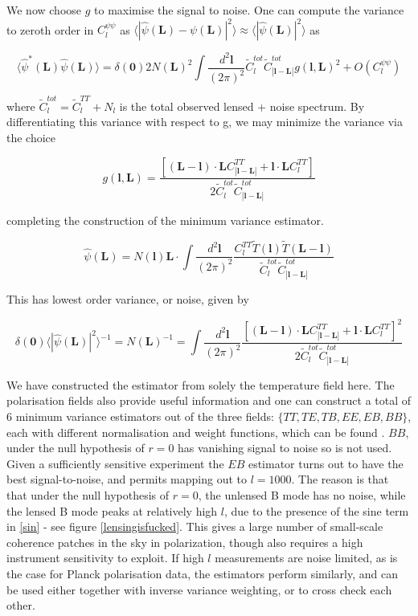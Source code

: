 \documentclass[a4paper,10pt]{article}
\renewcommand{\v}[1]{\mathbf{#1}}
\newcommand{\finttwo}[1]{\int \frac{d^2 \v{#1}}{(2\pi)^2}}
\begin{document}
We now choose $g$ to maximise the signal to noise. One can compute the variance to zeroth order in $C_l^{\psi\psi}$ as $\langle| \hat{\psi}(\v{L})-\psi(\v{L})|^2 \rangle \approx 
\langle| \hat{\psi}(\v{L})|^2 \rangle$ as

\begin{equation}
\langle\hat{\psi}^*(\v{L}) \hat{\psi}(\v{L}) \rangle = \delta(\v{0})2N(\v{L})^2\finttwo{l}\tilde{C}_l^{tot}\tilde{C}_{|\v{l}-\v{L}|}^{tot}g(\v{l},\v{L})^2 + O(C_l^{\psi\psi})
\end{equation}

where $\tilde{C}_l^{tot} = \tilde{C}_l^{TT} + N_l$ is the total observed lensed + noise spectrum. By differentiating this variance with respect to g, we may minimize the variance via the choice

\begin{equation}
g(\v{l},\v{L}) = \frac{[(\v{L}-\v{l})\cdot\v{L}C^{TT}_{|\v{l}-\v{L}|}+\v{l}\cdot\v{L}C_l^{TT}]}{2\tilde{C}_l^{tot}\tilde{C}_{|\v{l}-\v{L}|}^{tot}}
\end{equation}

completing the construction of the minimum variance estimator. 

\begin{equation}
\hat{\psi}(\v{L}) = N(\v{l})\v{L}\cdot\finttwo{l} \frac{C_l^{TT}\tilde{T}(\v{l})\tilde{T}(\v{L-l})}{\tilde{C}_l^{tot}\tilde{C}_{|\v{l}-\v{L}|}^{tot}}
\end{equation}


This has lowest order variance, or noise, given by


\begin{equation}
\delta(\v{0}) \langle |\hat{\psi}(\v{L})|^2 \rangle^{-1} =  N(\v{L})^{-1} = \finttwo{l}  \frac{[(\v{L}-\v{l})\cdot\v{L}C^{TT}_{|\v{l}-\v{L}|}+\v{l}\cdot\v{L}C_l^{TT}]^2}{2\tilde{C}_l^{tot}\tilde{C}_{|\v{l}-\v{L}|}^{tot}}
\end{equation}

We have constructed the estimator from solely the temperature field here. The polarisation fields also provide useful information and one can construct a total of 6 minimum variance estimators out of the three fields: $\{TT, TE, TB, EE, EB, BB\}$, each with different normalisation and weight functions, which can be found \cite{hu-estimator}. $BB$, under the null hypothesis of $r=0$ has vanishing signal to noise so is not used. Given a sufficiently sensitive experiment the $EB$ estimator turns out to have the best signal-to-noise, and permits mapping out to $l=1000$. The reason is that that under the null hypothesis of $r=0$, the unlensed B mode has no noise, while the lensed B mode peaks at relatively high $l$, due to the presence of the sine term in \ref{sin} - see figure \ref{lensingisfucked}. This gives a large number of small-scale coherence patches in the sky in polarization, though also requires a high instrument sensitivity to exploit. If high $l$ measurements are noise limited, as is the case for Planck polarisation data, the estimators perform similarly, and can be used either together with inverse variance weighting, or to cross check each other.
\end{document}
